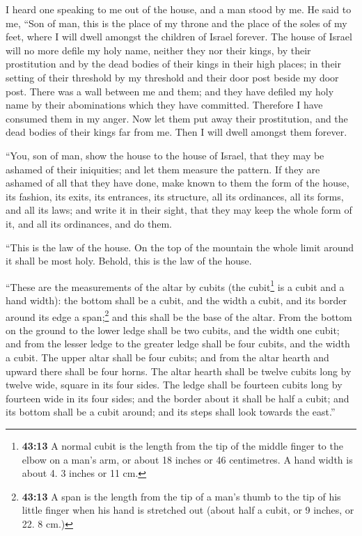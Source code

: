  I heard one speaking to me out of the house, and a man
stood by me.  He said to me, ``Son of man, this is the
place of my throne and the place of the soles of my feet, where I will
dwell amongst the children of Israel forever. The house of Israel will
no more defile my holy name, neither they nor their kings, by their
prostitution and by the dead bodies of their kings in their high places;
 in their setting of their threshold by my threshold and
their door post beside my door post. There was a wall between me and
them; and they have defiled my holy name by their abominations which
they have committed. Therefore I have consumed them in my anger.
 Now let them put away their prostitution, and the dead
bodies of their kings far from me. Then I will dwell amongst them
forever.

 ``You, son of man, show the house to the house of
Israel, that they may be ashamed of their iniquities; and let them
measure the pattern.  If they are ashamed of all that
they have done, make known to them the form of the house, its fashion,
its exits, its entrances, its structure, all its ordinances, all its
forms, and all its laws; and write it in their sight, that they may keep
the whole form of it, and all its ordinances, and do them.

 ``This is the law of the house. On the top of the
mountain the whole limit around it shall be most holy. Behold, this is
the law of the house.

 ``These are the measurements of the altar by cubits (the
cubit\footnote{\textbf{43:13} A normal cubit is the length from the tip
  of the middle finger to the elbow on a man's arm, or about 18 inches
  or 46 centimetres. A hand width is about 4. 3 inches or 11 cm.} is a
cubit and a hand width): the bottom shall be a cubit, and the width a
cubit, and its border around its edge a span;\footnote{\textbf{43:13} A
  span is the length from the tip of a man's thumb to the tip of his
  little finger when his hand is stretched out (about half a cubit, or 9
  inches, or 22. 8 cm.)} and this shall be the base of the altar.
 From the bottom on the ground to the lower ledge shall
be two cubits, and the width one cubit; and from the lesser ledge to the
greater ledge shall be four cubits, and the width a cubit.
 The upper altar shall be four cubits; and from the altar
hearth and upward there shall be four horns.  The altar
hearth shall be twelve cubits long by twelve wide, square in its four
sides.  The ledge shall be fourteen cubits long by
fourteen wide in its four sides; and the border about it shall be half a
cubit; and its bottom shall be a cubit around; and its steps shall look
towards the east.''

